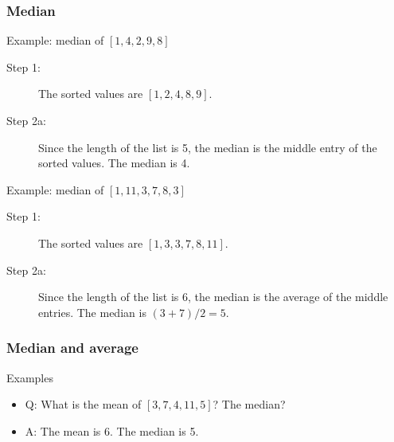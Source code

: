 \documentclass[handout]{beamer}
\begin{document}
   \begin{frame} \frametitle{Median}

   \begin{block}
   {Example: median of $[1,4,2,9,8]$}

   \begin{description}
   \item[Step 1:] The sorted values are $[1,2,4,8,9]$.

   \item[Step 2a:] Since the length of the list is 5, the median is the
   middle entry of the sorted values. The median is 4.

   \end{description}
   \end{block}

   \begin{block}
   {Example: median of $[1,11,3,7,8,3]$}

   \begin{description}
   \item[Step 1:] The sorted values are $[1,3,3,7,8,11]$.

   \item[Step 2a:] Since the length of the list is 6, the median is the
   average of the middle entries. The median is $(3+7)/2=5$.

   \end{description}
   \end{block}
   \end{frame}


   \begin{frame} \frametitle{Median and average}

   \begin{block}
   {Examples}

   \begin{itemize}
   \item Q: What is the mean of $[3,7,4,11,5]$? The median?

   \item A: The mean is 6. The median is 5.


   \end{itemize}
   \end{block}
   \end{frame}

\end{document}
